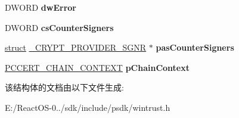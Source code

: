 \begin{DoxyCompactItemize}
\item 
\mbox{\label{struct___c_r_y_p_t___p_r_o_v_i_d_e_r___s_g_n_r_a5d32f16dc9841203ccd637a7f786f2b5}} 
D\+W\+O\+RD {\bfseries dw\+Error}
\item 
\mbox{\label{struct___c_r_y_p_t___p_r_o_v_i_d_e_r___s_g_n_r_a989a44e83d7d9eafff4d0271d44be27b}} 
D\+W\+O\+RD {\bfseries cs\+Counter\+Signers}
\item 
\mbox{\label{struct___c_r_y_p_t___p_r_o_v_i_d_e_r___s_g_n_r_a17b255486693f77ad3b7636827563687}} 
\hyperlink{interfacestruct}{struct} \hyperlink{struct___c_r_y_p_t___p_r_o_v_i_d_e_r___s_g_n_r}{\+\_\+\+C\+R\+Y\+P\+T\+\_\+\+P\+R\+O\+V\+I\+D\+E\+R\+\_\+\+S\+G\+NR} $\ast$ {\bfseries pas\+Counter\+Signers}
\item 
\mbox{\label{struct___c_r_y_p_t___p_r_o_v_i_d_e_r___s_g_n_r_a6f5a546a8eac1d03b1fdc14bbe7845a9}} 
\hyperlink{struct___c_e_r_t___c_h_a_i_n___c_o_n_t_e_x_t}{P\+C\+C\+E\+R\+T\+\_\+\+C\+H\+A\+I\+N\+\_\+\+C\+O\+N\+T\+E\+XT} {\bfseries p\+Chain\+Context}
\end{DoxyCompactItemize}


该结构体的文档由以下文件生成\+:\begin{DoxyCompactItemize}
\item 
E\+:/\+React\+O\+S-\/0../sdk/include/psdk/wintrust.\+h\end{DoxyCompactItemize}
